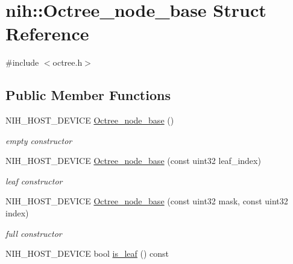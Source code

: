 \hypertarget{structnih_1_1_octree__node__base}{
\section{nih\-:\-:\-Octree\-\_\-node\-\_\-base \-Struct \-Reference}
\label{structnih_1_1_octree__node__base}
}


{\ttfamily \#include $<$octree.\-h$>$}

\subsection*{\-Public \-Member \-Functions}
\begin{DoxyCompactItemize}
\item 
\hypertarget{structnih_1_1_octree__node__base_a0b6a034d0fa0269866883ac53b391ea9}{
\-N\-I\-H\-\_\-\-H\-O\-S\-T\-\_\-\-D\-E\-V\-I\-C\-E \hyperlink{structnih_1_1_octree__node__base_a0b6a034d0fa0269866883ac53b391ea9}{\-Octree\-\_\-node\-\_\-base} ()}
\label{structnih_1_1_octree__node__base_a0b6a034d0fa0269866883ac53b391ea9}

\begin{DoxyCompactList}\small\item\em empty constructor \end{DoxyCompactList}\item 
\hypertarget{structnih_1_1_octree__node__base_a15b50dd5321adcc53f2803081c1d1168}{
\-N\-I\-H\-\_\-\-H\-O\-S\-T\-\_\-\-D\-E\-V\-I\-C\-E \hyperlink{structnih_1_1_octree__node__base_a15b50dd5321adcc53f2803081c1d1168}{\-Octree\-\_\-node\-\_\-base} (const uint32 leaf\-\_\-index)}
\label{structnih_1_1_octree__node__base_a15b50dd5321adcc53f2803081c1d1168}

\begin{DoxyCompactList}\small\item\em leaf constructor \end{DoxyCompactList}\item 
\hypertarget{structnih_1_1_octree__node__base_a9a2ebc5537988bf811a3e2714597190b}{
\-N\-I\-H\-\_\-\-H\-O\-S\-T\-\_\-\-D\-E\-V\-I\-C\-E \hyperlink{structnih_1_1_octree__node__base_a9a2ebc5537988bf811a3e2714597190b}{\-Octree\-\_\-node\-\_\-base} (const uint32 mask, const uint32 index)}
\label{structnih_1_1_octree__node__base_a9a2ebc5537988bf811a3e2714597190b}

\begin{DoxyCompactList}\small\item\em full constructor \end{DoxyCompactList}\item 
\hypertarget{structnih_1_1_octree__node__base_a313f30f552fbff26c54f4960d60034d3}{
\-N\-I\-H\-\_\-\-H\-O\-S\-T\-\_\-\-D\-E\-V\-I\-C\-E bool \hyperlink{structnih_1_1_octree__node__base_a313f30f552fbff26c54f4960d60034d3}{is\-\_\-leaf} () const }
\label{structnih_1_1_octree__node__base_a313f30f552fbff26c54f4960d60034d3}


\end{DoxyCompactItemize}
